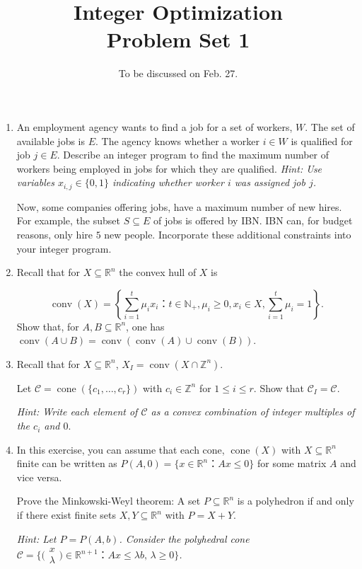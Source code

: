 \documentclass[11pt,a4paper]{article}
\title{Integer Optimization  \\ Problem Set 1 }
\date{To be discussed on Feb. 27.}
\newcommand{\smat}[1]{ \big(\begin{smallmatrix} #1 \end{smallmatrix}\big)}
\DeclareMathOperator{\conv}{conv}
\DeclareMathOperator{\cone}{cone}
\begin{document}
\maketitle 




\begin{enumerate} 
\item An employment agency wants to find a job for a set of workers, $W$. The set of available jobs is $E$. The agency knows whether a worker $i ∈ W$ is qualified for job $j ∈ E$. Describe an integer program to find the maximum number of workers being employed in jobs for which they are qualified. \emph{Hint: Use variables $x_{i,j} ∈ \{0,1\}$ indicating whether worker $i$ was assigned job $j$.}

Now, some companies offering jobs, have a maximum number of new hires. For example, the subset $S⊆ E$ of jobs is offered by IBN. IBN can, for budget reasons, only hire $5$ new people. Incorporate these additional  constraints into your integer program. 
\item Recall that for $X ⊆ ℝ^n$ the convex hull of $X$ is

  \begin{displaymath}
      \conv(X) = \left\{ ∑_{i=1}^t μ_i x_i ： t ∈ ℕ_+, μ_i ≥0, x_i ∈ X, ∑_{i=1}^t μ_i =1 \right\}.
  \end{displaymath}
Show that, for $A,B ⊆ ℝ^n$, one has $\conv(A ∪B) = \conv\left( \conv(A) ∪ \conv(B) \right)$.  

\item
  Recall that for $X ⊆ ℝ^n$, $X_I = \conv( X ∩ ℤ^n)$. 
  
  Let $\mathscr{C} = \cone(\{c_1,\dots,c_r\})$ with $c_i ∈ℤ^n$ for $1≤i≤r$. Show that $\mathscr{C}_I = \mathscr{C}$.

  \emph{Hint: Write each element of $\mathscr{C}$ as a convex combination of integer multiples of the $c_i$ and $0$}.

\item In this exercise, you can assume that each cone, $\cone (X)$ with $X ⊆ℝ^n$ finite can be written as $P(A,0) = \{ x ∈ℝ^n ： Ax≤0\}$ for some matrix $A$ and vice versa.

  Prove the Minkowski-Weyl theorem: A set $P ⊆ ℝ^n$ is a polyhedron if and only if there exist finite sets $X,Y ⊆ ℝ^n$ with $P = X+Y$.

  \emph{Hint: Let $P = P(A,b)$. Consider the polyhedral cone $\mathscr{C} = \{ \smat{x\\λ} ∈ℝ^{n+1}  ：Ax ≤ λb, \, λ≥0 \}$. }


\end{enumerate}
\end{document}
